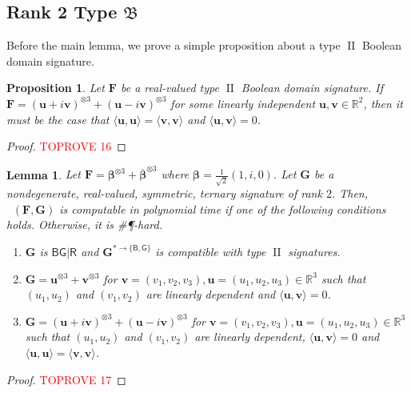 \documentclass[11pt]{article}
\newtheorem{lemma}[theorem]{Lemma}
\newtheorem{proposition}[theorem]{Proposition}
\DeclareMathOperator{\holts}{Holant^*_3}
\DeclareMathOperator{\typeii}{II}
\newcommand{\db}{\mathsf{B}}
\newcommand{\dg}{\mathsf{G}}
\newcommand{\dr}{\mathsf{R}}
\newcommand{\sph}{\#\P-hard\xspace}
\newcommand{\teh}{^{\otimes 3}}
\newcommand{\domres}[1]{
  ^{*\to\{#1\}}
}
\newcommand{\ternarytractz}{$\mathfrak{B}$\xspace}
\begin{document}
\subsection{Rank 2 Type \texorpdfstring{\ternarytractz}{B}}
Before the main lemma, we prove a simple proposition about a type $\typeii$ Boolean domain signature.
\begin{proposition}\label{prop:typeii-same-norm}
  Let $\mathbf{F}$ be a real-valued type $\typeii$ Boolean domain signature.
  If $\mathbf{F} = (\mathbf{u} + i \mathbf{v}) \teh + (\mathbf{u} - i \mathbf{v})\teh$ for some linearly independent $\mathbf{u}, \mathbf{v} \in \mathbb{R}^2$,
  then it must be the case that $\langle \mathbf{u}, \mathbf{u} \rangle = \langle \mathbf{v}, \mathbf{v} \rangle$ and $\langle \mathbf{u}, \mathbf{v} \rangle = 0$.
\end{proposition}
\begin{proof}\textcolor{red}{TOPROVE 16}\end{proof}

\begin{lemma}\label{lem:dichotomy-terneray-ternary-rank-2-z}
  Let $\mathbf{F} = \boldsymbol{\beta} \teh + \overline{\boldsymbol{\beta}} \teh$ where $\boldsymbol{\beta} = \frac{1}{\sqrt{2}} (1, i, 0)$.
  Let $\mathbf{G}$ be a nondegenerate, real-valued, symmetric, ternary signature of rank $2$.
  Then, $\holts(\mathbf{F}, \mathbf{G})$ is computable in polynomial time if one of the following conditions holds. Otherwise, it is \sph.
  \begin{enumerate}
    \item $\mathbf{G}$ is $\db \dg | \dr$ and $\mathbf{G}\domres{\db, \dg}$ is compatible with type $\typeii$ signatures.
    \item $\mathbf{G} = \mathbf{u}\teh + \mathbf{v}\teh$ for $\mathbf{v} = (v_1, v_2, v_3), \mathbf{u} = (u_1, u_2, u_3) \in \mathbb{R}^3$ such that $(u_1, u_2)$ and $(v_1, v_2)$ are linearly dependent and $\langle \mathbf{u}, \mathbf{v} \rangle = 0$.
    \item $\mathbf{G} = (\mathbf{u} + i \mathbf{v})\teh + (\mathbf{u} - i \mathbf{v})\teh$ for $\mathbf{v} = (v_1, v_2, v_3), \mathbf{u} = (u_1, u_2, u_3) \in \mathbb{R}^3$ such that $(u_1, u_2)$ and $(v_1, v_2)$ are linearly dependent, $\langle \mathbf{u}, \mathbf{v} \rangle = 0$ and $\langle \mathbf{u}, \mathbf{u} \rangle = \langle \mathbf{v}, \mathbf{v} \rangle$.
  \end{enumerate}
\end{lemma}
\begin{proof}\textcolor{red}{TOPROVE 17}\end{proof}
\end{document}
